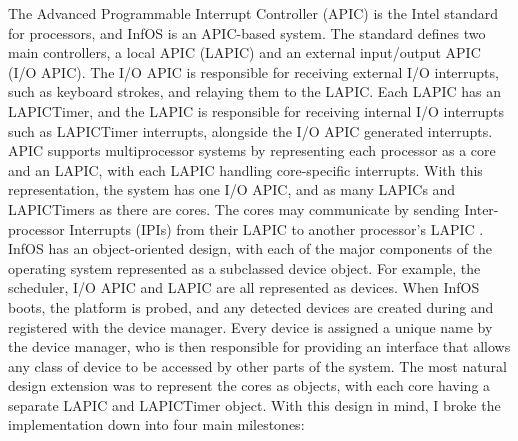 \documentclass[bsc,frontabs,twoside,singlespacing,parskip,deptreport]{infthesis}     %
\begin{document}
The Advanced Programmable Interrupt Controller (APIC) \cite{intel-sys-prog-guide} is the Intel standard for processors, and InfOS is an APIC-based system. The standard defines two main controllers, a local APIC (LAPIC) and an external input/output APIC (I/O APIC). The I/O APIC is responsible for receiving external I/O interrupts, such as keyboard strokes, and relaying them to the LAPIC. Each LAPIC has an LAPICTimer, and the LAPIC is responsible for receiving internal I/O interrupts such as LAPICTimer interrupts, alongside the I/O APIC generated interrupts. APIC supports multiprocessor systems by representing each processor as a core and an LAPIC, with each LAPIC handling core-specific interrupts. With this representation, the system has one I/O APIC, and as many LAPICs and LAPICTimers as there are cores. The cores may communicate by sending Inter-processor Interrupts (IPIs) from their LAPIC to another processor’s LAPIC \cite{intel-sys-prog-guide}. InfOS has an object-oriented design, with each of the major components of the operating system represented as a subclassed device object. For example, the scheduler, I/O APIC and LAPIC are all represented as devices. When InfOS boots, the platform is probed, and any detected devices are created during and registered with the device manager. Every device is assigned a unique name by the device manager, who is then responsible for providing an interface that allows any class of device to be accessed by other parts of the system. The most natural design extension was to represent the cores as objects, with each core having a separate LAPIC and LAPICTimer object. With this design in mind, I broke the implementation down into four main milestones:
\end{document}
